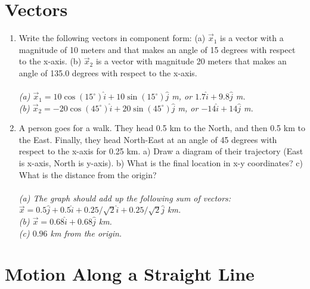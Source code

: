 \documentclass[10pt]{article}
\begin{document}
\section{Vectors}

\begin{enumerate}
\item Write the following vectors in component form: (a) $\vec{x}_1$ is a vector with a magnitude of 10 meters and that makes an angle of 15 degrees with respect to the x-axis. (b) $\vec{x}_2$ is a vector with magnitude 20 meters that makes an angle of 135.0 degrees with respect to the x-axis.  \\ \\
\textit{(a) $\vec{x}_1 = 10\cos(15^{\circ})\hat{i} + 10\sin(15^{\circ})\hat{j}$ m, or $1.7 \hat{i} + 9.8 \hat{j}$ m.} \\
\textit{(b) $\vec{x}_2 = -20\cos(45^{\circ})\hat{i} + 20\sin(45^{\circ})\hat{j}$ m, or $-14 \hat{i} + 14 \hat{j}$ m.}
\item A person goes for a walk.  They head 0.5 km to the North, and then 0.5 km to the East.  Finally, they head North-East at an angle of 45 degrees with respect to the x-axis for 0.25 km.  a) Draw a diagram of their trajectory (East is x-axis, North is y-axis). b) What is the final location in x-y coordinates? c) What is the distance from the origin? \\ \\
\textit{(a) The graph should add up the following sum of vectors: $\vec{x} = 0.5\hat{j} + 0.5\hat{i} + 0.25/\sqrt{2}\hat{i} + 0.25/\sqrt{2} \hat{j}$ km.} \\
\textit{(b) $\vec{x} = 0.68\hat{i} +0.68\hat{j}$ km.} \\
\textit{(c) $0.96$ km from the origin.}
\end{enumerate}

\section{Motion Along a Straight Line}
\end{document}

